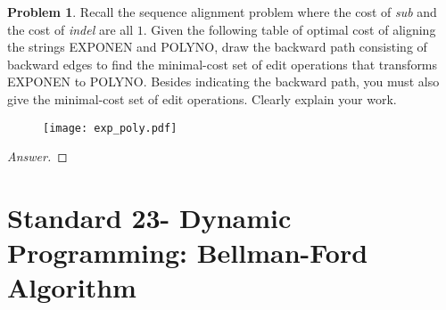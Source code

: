 \documentclass[11pt]{article}
\theoremstyle{definition}
\theoremstyle{definition}
\newtheorem{required}{Problem}
\theoremstyle{definition}
\begin{document}
\newpage
\begin{required}
Recall the sequence alignment problem where the cost of {\em sub} and the cost of {\em indel} are all $1$. Given the following table of optimal cost of aligning the strings EXPONEN and POLYNO, draw the backward path consisting of backward edges to find the minimal-cost set of edit operations that transforms EXPONEN to POLYNO. Besides indicating the backward path, you must also give the minimal-cost set of edit operations.  Clearly explain your work. 
        \begin{figure}[h!]
        \begin{center}
        \texttt{[image: exp\_poly.pdf]} 
        \end{center}
        \end{figure}

\begin{proof}[Answer]
\end{proof}

\end{required}

\newpage
\section{Standard 23- Dynamic Programming: Bellman-Ford Algorithm}
\end{document}
